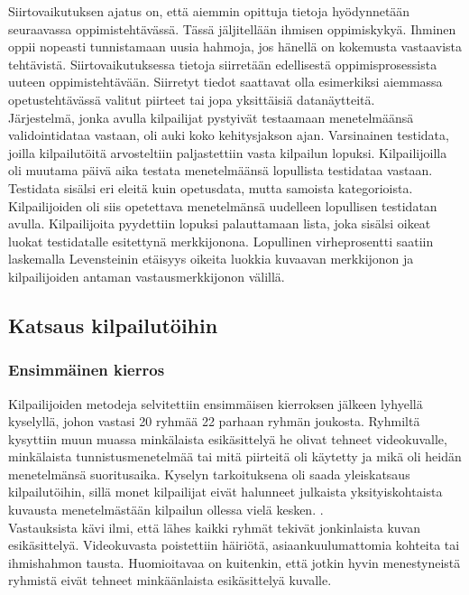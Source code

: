 Siirtovaikutuksen ajatus on, että aiemmin opittuja tietoja hyödynnetään seuraavassa oppimistehtävässä. Tässä jäljitellään  
ihmisen oppimiskykyä. Ihminen oppii nopeasti tunnistamaan uusia hahmoja, jos hänellä on kokemusta vastaavista tehtävistä.
Siirtovaikutuksessa tietoja siirretään edellisestä oppimisprosessista uuteen oppimistehtävään.
Siirretyt tiedot saattavat olla esimerkiksi aiemmassa opetustehtävässä valitut piirteet tai jopa yksittäisiä datanäytteitä. \citep{5288526}\\

Järjestelmä, jonka avulla kilpailijat pystyivät testaamaan menetelmäänsä validointidataa vastaan, oli auki koko kehitysjakson ajan.
Varsinainen testidata, joilla kilpailutöitä arvosteltiin paljastettiin vasta kilpailun lopuksi. Kilpailijoilla oli muutama päivä aika
testata menetelmäänsä lopullista testidataa vastaan. Testidata sisälsi eri eleitä kuin opetusdata, mutta samoista kategorioista.
Kilpailijoiden oli siis opetettava menetelmänsä uudelleen lopullisen testidatan avulla. Kilpailijoita pyydettiin lopuksi
palauttamaan lista, joka sisälsi oikeat luokat testidatalle esitettynä merkkijonona. Lopullinen virheprosentti saatiin laskemalla Levensteinin etäisyys
oikeita luokkia kuvaavan merkkijonon ja kilpailijoiden antaman vastausmerkkijonon välillä. \citep{6239178} 


\subsection{Katsaus kilpailutöihin}
\subsubsection {Ensimmäinen kierros}
Kilpailijoiden metodeja selvitettiin ensimmäisen kierroksen jälkeen lyhyellä kyselyllä, johon vastasi 20 ryhmää 22 parhaan ryhmän joukosta.
Ryhmiltä kysyttiin muun muassa minkälaista esikäsittelyä he olivat tehneet videokuvalle, minkälaista tunnistusmenetelmää tai mitä piirteitä oli käytetty ja
mikä oli heidän menetelmänsä suoritusaika. Kyselyn tarkoituksena oli saada yleiskatsaus kilpailutöihin, sillä monet kilpailijat eivät
halunneet julkaista yksityiskohtaista kuvausta menetelmästään kilpailun ollessa vielä kesken. \citep {6239178}. \\

Vastauksista kävi ilmi, että lähes kaikki ryhmät tekivät jonkinlaista kuvan esikäsittelyä. Videokuvasta poistettiin häiriötä, asiaankuulumattomia 
kohteita tai ihmishahmon tausta. Huomioitavaa on kuitenkin, että jotkin hyvin menestyneistä ryhmistä eivät tehneet minkäänlaista esikäsittelyä kuvalle.
\citep {6239178}\\

